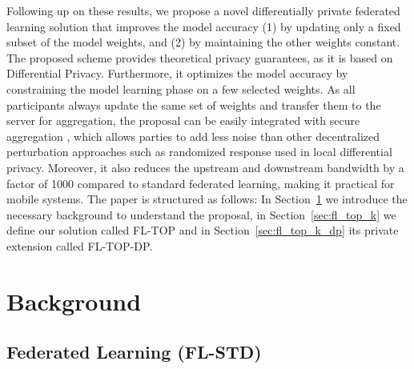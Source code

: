 \documentclass[accepted]{uai2021} %
\begin{document}
Following up on these results, we propose a novel differentially private federated learning solution that improves the model accuracy (1) by updating only a fixed subset of the model weights, and (2) by maintaining the other weights constant. The proposed scheme provides theoretical privacy guarantees, as it is based on Differential Privacy.  Furthermore, it optimizes
the model accuracy by constraining the model learning phase on a few selected weights. As all participants always update the same set of weights and transfer them to the server for aggregation, the proposal can be easily integrated with secure aggregation \citep{BonawitzIKMMPRS16}, which allows parties to add less noise than other decentralized perturbation approaches such as randomized response \citep{ErlingssonPK14} used in local differential privacy.
Moreover, it also reduces the upstream and downstream bandwidth by a factor of 1000 compared to standard federated learning, making it practical
for mobile systems. 
The paper is structured as follows: In Section~\ref{sec:backg} we introduce the necessary background to understand the proposal, in Section~\ref{sec:fl_top_k} we define our solution called FL-TOP and in Section~\ref{sec:fl_top_k_dp} its private extension called FL-TOP-DP.



\section{Background}
\label{sec:backg}
\subsection{Federated Learning (FL-STD)}
\label{FL-STANDARD}
\end{document}
